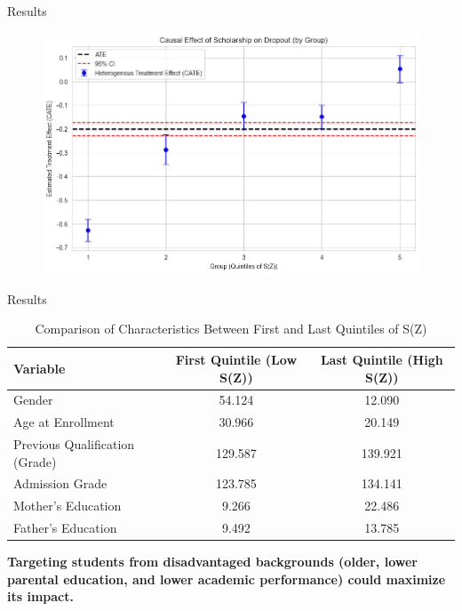 \documentclass[aspectratio=169]{beamer}
\begin{document}
\begin{frame}{Results}

\begin{figure}[h!]  
        \includegraphics[width=0.8\linewidth]{Tex_Pictures/HE_quintile_dropout.png}

 \end{figure}   
\end{frame}



\begin{frame}{Results}
\begin{table}[h]
    \centering
    \begin{tabular}{l c c}
        \hline
        \textbf{Variable} & \textbf{First Quintile (Low S(Z))} & \textbf{Last Quintile (High S(Z))} \\
        \hline
        Gender & 54.124 & 12.090 \\
        Age at Enrollment & 30.966 & 20.149 \\
        Previous Qualification (Grade) & 129.587 & 139.921 \\
        Admission Grade & 123.785 & 134.141 \\
        Mother’s Education & 9.266 & 22.486 \\
        Father’s Education & 9.492 & 13.785 \\
        \hline
    \end{tabular}
    \caption{Comparison of Characteristics Between First and Last Quintiles of S(Z)}
    \label{tab:quintile_comparison}
\end{table}




 \textbf{Targeting students from disadvantaged backgrounds (older, lower parental education, and lower academic performance) could maximize its impact.}
\end{frame}
\end{document}
